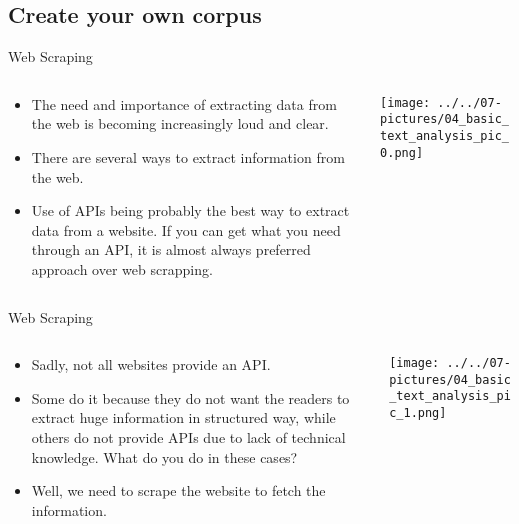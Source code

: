 \documentclass[11pt]{beamer}
\begin{document}
\subsection{Create your own corpus \\ \scalebox{0.8}{Getting text from the web}}
\begin{frame}{Web Scraping}
\begin{columns}[T] %
\begin{column}{.48\textwidth}
        \begin{itemize}
		\item The need and importance of extracting data from the web is becoming increasingly loud and clear. 
		\item There are several ways to extract information from the web. 
		\item Use of APIs being probably the best way to extract data from a website. If you can get what you need through an API, it is almost always preferred approach over web scrapping. 
        \end{itemize}
\end{column}%
\hfill%
\begin{column}{.48\textwidth}
        \texttt{[image: ../../07-pictures/04\_basic\_text\_analysis\_pic\_0.png]}
\end{column}%
\end{columns}
\end{frame}
\begin{frame}{Web Scraping}
\begin{columns}[T] %
\begin{column}{.48\textwidth}
        \begin{itemize}
		\item Sadly, not all websites provide an API. 
		\item Some do it because they do not want the readers to extract huge information in structured way, while others do not provide APIs due to lack of technical knowledge. What do you do in these cases? 
		\item Well, we need to scrape the website to fetch the information.
        \end{itemize}
\end{column}%
\hfill%
\begin{column}{.48\textwidth}
        \texttt{[image: ../../07-pictures/04\_basic\_text\_analysis\_pic\_1.png]}
\end{column}%
\end{columns}
\end{frame}
\end{document}
